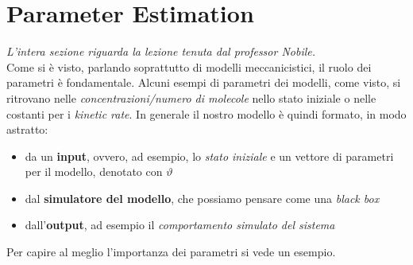 \documentclass[a4paper,12pt, oneside]{book}
\begin{document}
\section{Parameter Estimation}
\textit{L'intera sezione riguarda la lezione tenuta dal professor Nobile.}\\
Come si è visto, parlando soprattutto di modelli meccanicistici, il ruolo dei
parametri è fondamentale. Alcuni esempi di parametri dei modelli, come visto, si
ritrovano nelle \textit{concentrazioni/numero di molecole} nello stato iniziale
o nelle costanti per i \textit{kinetic rate}. In generale il nostro modello è
quindi formato, in modo astratto:
\begin{itemize}
  \item da un \textbf{input}, ovvero, ad esempio, lo \textit{stato iniziale} e
  un vettore di parametri per il modello, denotato con $\vartheta$
  \item dal \textbf{simulatore del modello}, che possiamo pensare come una
  \textit{black box}
  \item dall'\textbf{output}, ad esempio il \textit{comportamento simulato del
    sistema} 
\end{itemize}
Per capire al meglio l'importanza dei parametri si vede un esempio.
\end{document}

